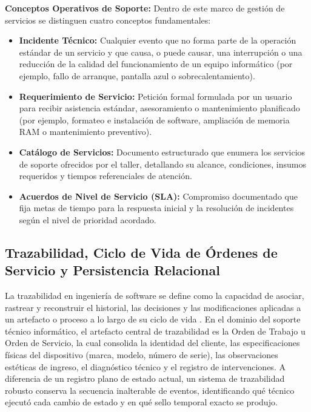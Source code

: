 \textbf{Conceptos Operativos de Soporte:} Dentro de este marco de gestión de servicios se distinguen cuatro conceptos fundamentales:

\begin{itemize}
    \item \textbf{Incidente Técnico:} Cualquier evento que no forma parte de la operación estándar de un servicio y que causa, o puede causar, una interrupción o una reducción de la calidad del funcionamiento de un equipo informático (por ejemplo, fallo de arranque, pantalla azul o sobrecalentamiento).
    \item \textbf{Requerimiento de Servicio:} Petición formal formulada por un usuario para recibir asistencia estándar, asesoramiento o mantenimiento planificado (por ejemplo, formateo e instalación de software, ampliación de memoria RAM o mantenimiento preventivo).
    \item \textbf{Catálogo de Servicios:} Documento estructurado que enumera los servicios de soporte ofrecidos por el taller, detallando su alcance, condiciones, insumos requeridos y tiempos referenciales de atención.
    \item \textbf{Acuerdos de Nivel de Servicio (SLA):} Compromiso documentado que fija metas de tiempo para la respuesta inicial y la resolución de incidentes según el nivel de prioridad acordado.
\end{itemize}

\subsection{Trazabilidad, Ciclo de Vida de Órdenes de Servicio y Persistencia Relacional}

La trazabilidad en ingeniería de software se define como la capacidad de asociar, rastrear y reconstruir el historial, las decisiones y las modificaciones aplicadas a un artefacto o proceso a lo largo de su ciclo de vida \cite{gotel1994, moe1998, ramesh2001, olsen2002}. En el dominio del soporte técnico informático, el artefacto central de trazabilidad es la Orden de Trabajo u Orden de Servicio, la cual consolida la identidad del cliente, las especificaciones físicas del dispositivo (marca, modelo, número de serie), las observaciones estéticas de ingreso, el diagnóstico técnico y el registro de intervenciones. A diferencia de un registro plano de estado actual, un sistema de trazabilidad robusto conserva la secuencia inalterable de eventos, identificando qué técnico ejecutó cada cambio de estado y en qué sello temporal exacto se produjo.

